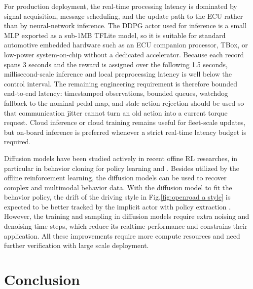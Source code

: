\documentclass{article}
\begin{document}
For production deployment, the real-time processing latency is dominated by signal acquisition, message scheduling, and the update path to the ECU rather than by neural-network inference. The DDPG actor used for inference is a small MLP exported as a sub-1MB TFLite model, so it is suitable for standard automotive embedded hardware such as an ECU companion processor, TBox, or low-power system-on-chip without a dedicated accelerator. Because each record spans 3 seconds and the reward is assigned over the following 1.5 seconds, millisecond-scale inference and local preprocessing latency is well below the control interval. The remaining engineering requirement is therefore bounded end-to-end latency: timestamped observations, bounded queues, watchdog fallback to the nominal pedal map, and stale-action rejection should be used so that communication jitter cannot turn an old action into a current torque request. Cloud inference or cloud training remains useful for fleet-scale updates, but on-board inference is preferred whenever a strict real-time latency budget is required.

Diffusion models have been studied actively in recent offine RL researches, in particular in behavior cloning for policy learning \parencite{janner22:_plann_diffus_flexib_behav_synth} \parencite{wang22:_diffus_polic_expres_polic_class} and \parencite{hansen-estruch23:_idql} \parencite{psenka23:_learn_diffus_model_polic_rewar}. Besides utilized by the offline reinforcement learning, the diffusion models can be used to recover complex and multimodal behavior data. With the diffusion model to fit the behavior policy, the drift of the driving style in Fig.\@\ref{fig:openroad a style} is expected to be better tracked by the implicit actor with policy extraction \parencite{hansen-estruch23:_idql}. However, the training and sampling in diffusion models require extra noising and denoising time steps, which reduce its realtime performance and constrains their application. All these improvements require more compute resources and need further verification with large scale deployment.

\section{Conclusion}\label{sec:conclusion}
\end{document}

